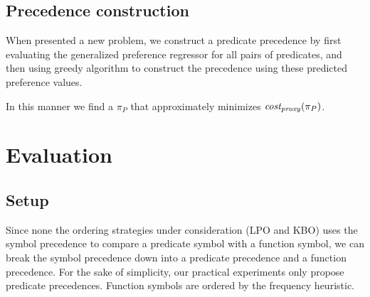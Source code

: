 

\subsection{Precedence construction}

When presented a new problem, we construct a predicate precedence by
first evaluating the generalized preference regressor for all pairs of predicates,
and then using greedy algorithm to construct the precedence using these predicted preference values.

In this manner we find a \(\pi_P\) that approximately minimizes \(\operatorname{\mathit{cost_{proxy}}}(\pi_P)\).

\section{Evaluation}
\label{sec:evaluation}

\subsection{Setup}

Since none the ordering strategies under consideration (LPO and KBO)
uses the symbol precedence to compare a predicate symbol with a function symbol,
we can break the symbol precedence down into a predicate precedence and a function precedence.
For the sake of simplicity,
our practical experiments only propose predicate precedences.
Function symbols are ordered by the frequency heuristic.

